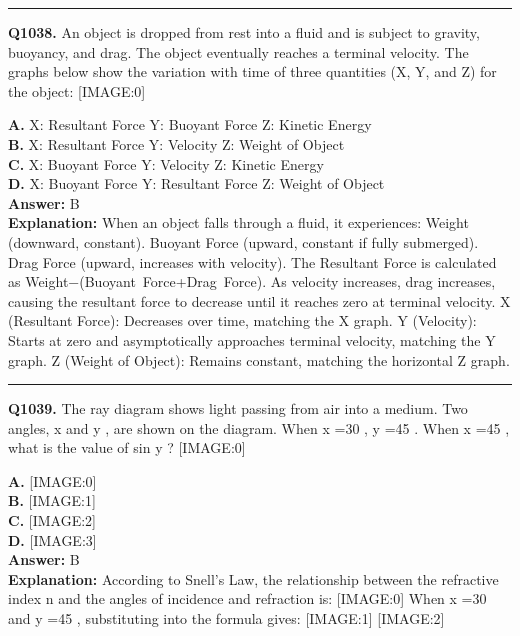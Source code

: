 \documentclass[12pt]{article}
\begin{document}
\hrule
\vspace{1em}


\noindent
\textbf{Q1038.} An object is dropped from rest into a fluid and is subject to gravity, buoyancy, and drag. The object eventually reaches a terminal velocity. The graphs below show the variation with time of three quantities (X, Y, and Z) for the object:
[IMAGE:0]



\textbf{A.} X:
Resultant Force
Y:
Buoyant Force
Z:
Kinetic Energy \\
\textbf{B.} X:
Resultant Force
Y:
Velocity
Z:
Weight of Object \\
\textbf{C.} X:
Buoyant Force
Y:
Velocity
Z:
Kinetic Energy \\
\textbf{D.} X:
Buoyant Force
Y:
Resultant Force
Z:
Weight of Object \\

\textbf{Answer:} B \\
\textbf{Explanation:} When an object falls through a fluid, it experiences:
Weight (downward, constant).
Buoyant Force (upward, constant if fully submerged).
Drag Force (upward, increases with velocity).
The Resultant Force is calculated as Weight−(Buoyant Force+Drag Force). As velocity increases, drag increases, causing the resultant force to decrease until it reaches zero at terminal velocity.
X (Resultant Force): Decreases over time, matching the X graph.
Y (Velocity): Starts at zero and asymptotically approaches terminal velocity, matching the Y graph.
Z (Weight of Object): Remains constant, matching the horizontal Z graph.

\hrule
\vspace{1em}


\noindent
\textbf{Q1039.} The ray diagram shows light passing from air into a medium. Two angles,
x
and
y
, are shown on the diagram. When
x
=30
\circ 
,
y
=45
\circ 
. When
x
=45
\circ 
, what is the value of sin
y
?
[IMAGE:0]



\textbf{A.} [IMAGE:0] \\
\textbf{B.} [IMAGE:1] \\
\textbf{C.} [IMAGE:2] \\
\textbf{D.} [IMAGE:3] \\

\textbf{Answer:} B \\
\textbf{Explanation:} According to Snell's Law, the relationship between the refractive index
n
and the angles of incidence and refraction is:
[IMAGE:0]
When
x
=30
\circ 
and
y
=45
\circ 
, substituting into the formula gives:
[IMAGE:1]
[IMAGE:2]
\end{document}
